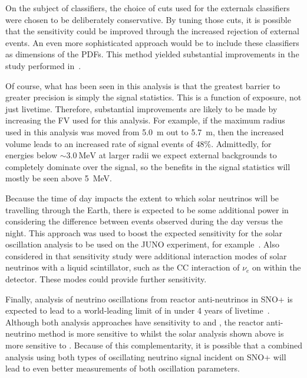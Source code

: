 On the subject of classifiers, the choice of cuts used for the externals classifiers were chosen to be deliberately conservative. By tuning those cuts, it is possible that the sensitivity could be improved through the increased rejection of external events. An even more sophisticated approach would be to include these classifiers as dimensions of the PDFs. This method yielded substantial improvements in the \onbb{} study performed in~\cite{kroupovaImprovingSensitivityNeutrinoless2020}.

Of course, what has been seen in this analysis is that the greatest barrier to greater precision is simply the signal statistics. This is a function of exposure, not just livetime. Therefore, substantial improvements are likely to be made by increasing the FV used for this analysis. For example, if the maximum radius used in this analysis was moved from \SI{5.0}{\metre} out to \SI{5.7}{\metre}, then the increased volume leads to an increased rate of signal events of 48\%. Admittedly, for energies below $\sim\SI{3.0}{\MeV}$ at larger radii we expect external backgrounds to completely dominate over the signal, so the benefits in the signal statistics will mostly be seen above \SI{5}{\MeV}.

Because the time of day impacts the extent to which solar neutrinos will be travelling through the Earth, there is expected to be some additional power in considering the difference between events observed during the day versus the night. This approach was used to boost the expected sensitivity for the solar oscillation analysis to be used on the JUNO experiment, for example~\cite{abuslemeFeasibilityPhysicsPotential2020,zhaoModelIndependentApproach2022}. %
Also considered in that sensitivity study were additional interaction modes of solar neutrinos with a liquid scintillator, such as the CC interaction of $\nu_{e}$ on  within the detector. These modes could provide further sensitivity.

Finally, analysis of neutrino oscillations from reactor anti-neutrinos in SNO+ is expected to lead to a world-leading limit of \dmsq{} in under 4 years of livetime~\cite{morton-blakeFirstMeasurementReactor2021}. Although both analysis approaches have sensitivity to \dmsq{} and \tonetwo{}, the reactor anti-neutrino method is more sensitive to \dmsq{} whilst the solar analysis shown above is more sensitive to \tonetwo{}. Because of this complementarity, it is possible that a combined analysis using both types of oscillating neutrino signal incident on SNO+ will lead to even better measurements of both oscillation parameters.


